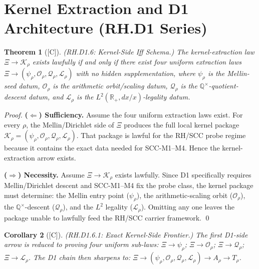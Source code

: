 \documentclass[12pt,oneside]{amsbook}
\theoremstyle{plain}
\newtheorem{theorem}{Theorem}[section]
\newtheorem{corollary}[theorem]{Corollary}
\theoremstyle{definition}
\theoremstyle{remark}
\newcommand{\status}[1]{\textup{[#1]}}
\begin{document}
\section{Kernel Extraction and D1 Architecture (RH.D1 Series)}
\label{sec:rh-d1-arch}

\begin{theorem}[\status{C}]\label{thm:rh-d1-6}
\textup{(RH.D1.6: Kernel-Side Iff Schema.)}
The kernel-extraction law $\Xi \to \mathcal{K}_\rho$ exists lawfully
if and only if there exist four uniform extraction laws
$\Xi \to (\psi_\rho, \mathcal{O}_\rho, \mathcal{Q}_\rho,
\mathcal{L}_\rho)$ with no hidden supplementation, where
$\psi_\rho$ is the Mellin-seed datum, $\mathcal{O}_\rho$ is the
arithmetic orbit/scaling datum, $\mathcal{Q}_\rho$ is the
$\mathbb{Q}^\times$-quotient-descent datum, and $\mathcal{L}_\rho$
is the $L^2(\mathbb{R}_+, dx/x)$-legality datum.
\end{theorem}

\begin{proof}
\textbf{($\Leftarrow$) Sufficiency.}
Assume the four uniform extraction laws exist. For every $\rho$,
the Mellin/Dirichlet side of $\Xi$ produces the full local kernel
package $\mathcal{K}_\rho = (\psi_\rho, \mathcal{O}_\rho,
\mathcal{Q}_\rho, \mathcal{L}_\rho)$. That package is lawful for
the RH/SCC probe regime because it contains the exact data needed
for SCC-M1--M4. Hence the kernel-extraction arrow exists.

\textbf{($\Rightarrow$) Necessity.}
Assume $\Xi \to \mathcal{K}_\rho$ exists lawfully. Since D1
specifically requires Mellin/Dirichlet descent and SCC-M1--M4 fix
the probe class, the kernel package must determine: the Mellin entry
point ($\psi_\rho$), the arithmetic-scaling orbit ($\mathcal{O}_\rho$),
the $\mathbb{Q}^\times$-descent ($\mathcal{Q}_\rho$), and the $L^2$
legality ($\mathcal{L}_\rho$). Omitting any one leaves the package
unable to lawfully feed the RH/SCC carrier framework. \qed
\end{proof}

\begin{corollary}[\status{C}]\label{cor:rh-d1-6-1}
\textup{(RH.D1.6.1: Exact Kernel-Side Frontier.)}
The first D1-side arrow is reduced to proving four uniform sub-laws:
$\Xi \to \psi_\rho$; $\Xi \to \mathcal{O}_\rho$;
$\Xi \to \mathcal{Q}_\rho$; $\Xi \to \mathcal{L}_\rho$.
The D1 chain then sharpens to:
$\Xi \to (\psi_\rho, \mathcal{O}_\rho, \mathcal{Q}_\rho,
\mathcal{L}_\rho) \to A_\rho \to T_\rho$.
\end{corollary}
\end{document}
